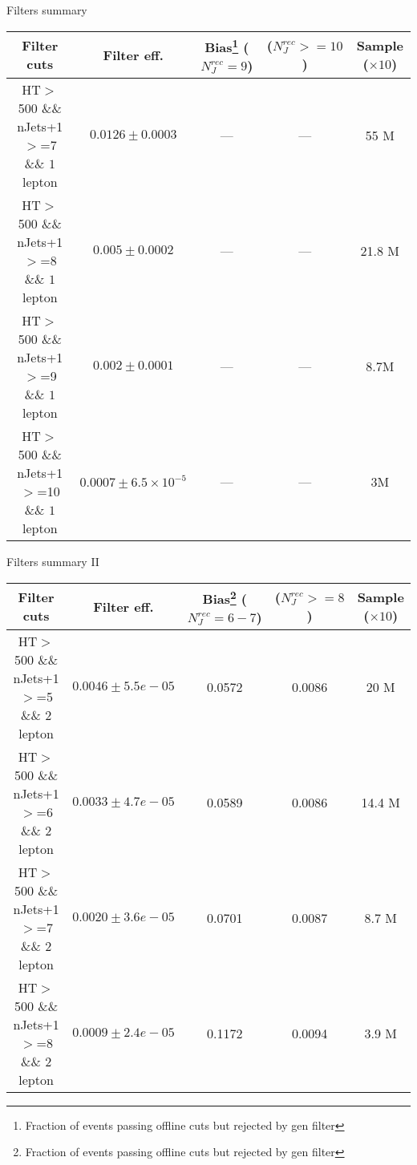 \documentclass{beamer}
\begin{document}
\begin{frame}{Filters summary}

\begin{center}
{\tiny \begin{tabular}{|c|c|c|c|c|}
\hline Filter cuts & Filter eff. & Bias\footnote{Fraction of events passing offline cuts but rejected by gen filter}  ($N_J^{rec}=9$)&  ($N_J^{rec}>=10$)&  Sample ($\times 10$) \\ 
\hline \thead{HT$>$500 \\ \&\& nJets+1$>$=7 \\ \&\& $1$ lepton} & $0.0126 \pm 0.0003$  & --- & --- & 55 M\\ 
\hline \thead{HT$>$500 \\ \&\& nJets+1$>$=8 \\ \&\& $1$ lepton} & $0.005 \pm 0.0002$  & --- & --- & 21.8 M\\ 
\hline \thead{HT$>$500 \\ \&\& nJets+1$>$=9 \\ \&\& $1$ lepton} & $0.002 \pm 0.0001$  & --- & --- & 8.7M\\ 
\hline \thead{HT$>$500 \\ \&\& nJets+1$>$=10 \\ \&\& $1$ lepton} & $0.0007 \pm 6.5\times 10^{-5}$  & --- & --- & 3M\\
\hline 
\end{tabular} }
\end{center}

\end{frame}

\begin{frame}{Filters summary II}

\begin{center}
{\tiny \begin{tabular}{|c|c|c|c|c|}
\hline Filter cuts 	& Filter eff. 	& Bias\footnote{Fraction of events passing offline cuts but rejected by gen filter}  ($N_J^{rec}=6-7$)&  ($N_J^{rec}>=8$)&  Sample ($\times 10$) \\
\hline \thead{HT$>$500 \\ \&\& nJets+1$>$=5 \\ \&\& $2$ lepton} & $0.0046 \pm 5.5e-05$  & 0.0572 & 0.0086 & 20 M\\ 
\hline \thead{HT$>$500 \\ \&\& nJets+1$>$=6 \\ \&\& $2$ lepton} & $0.0033 \pm 4.7e-05$  & 0.0589 & 0.0086 & 14.4 M\\
\hline \thead{HT$>$500 \\ \&\& nJets+1$>$=7 \\ \&\& $2$ lepton} & $0.0020 \pm 3.6e-05$  & 0.0701 & 0.0087 & 8.7 M\\ 
\hline \thead{HT$>$500 \\ \&\& nJets+1$>$=8 \\ \&\& $2$ lepton} & $0.0009 \pm 2.4e-05$  & 0.1172 & 0.0094 & 3.9 M\\
\hline 
\end{tabular} }
\end{center}

\end{frame}
\end{document}
